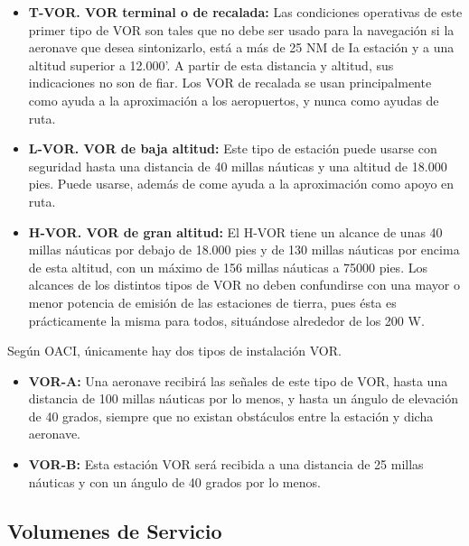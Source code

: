 \begin{itemize}
\item \textbf{T-VOR. VOR terminal o de recalada:} Las condiciones operativas de este primer tipo de VOR son tales que no debe ser usado para la navegación si la aeronave que desea sintonizarlo, está a más de 25 NM de Ia estación y a una altitud superior a 12.000'. A partir de esta distancia y altitud, sus indicaciones no son de fiar.
Los VOR de recalada se usan principalmente como ayuda a la aproximación a los aeropuertos, y nunca como ayudas de ruta.


\item \textbf{L-VOR. VOR de baja altitud:}  Este tipo de estación puede usarse con seguridad hasta una distancia de 40 millas náuticas y una altitud de 18.000 pies. Puede usarse, además de come ayuda a la aproximación como apoyo en ruta.


\item \textbf{H-VOR. VOR de gran altitud:} El H-VOR tiene un alcance de unas 40 millas náuticas por debajo de 18.000 pies y de 130 millas náuticas por encima de esta altitud, con un máximo de 156 millas náuticas a  75000 pies. Los alcances de los distintos tipos de VOR no deben confundirse con una mayor o menor potencia de emisión de las estaciones de tierra, pues ésta es prácticamente la misma para todos, situándose alrededor de los 200 W. 

\end{itemize}

Según OACI, únicamente hay dos tipos de instalación VOR. 

\begin{itemize}
\item \textbf{VOR-A:} Una aeronave recibirá las señales de este tipo de VOR, hasta una distancia de 100 millas náuticas por lo menos, y hasta un ángulo de elevación de 40 grados, siempre que no existan obstáculos entre la estación y dicha aeronave.

\item \textbf{VOR-B:} Esta estación VOR será recibida a una distancia de 25 millas náuticas y con un ángulo de 40 grados por lo menos.

\end{itemize}

\subsection{Volumenes de Servicio}
\label{sec:volumenes.de.servicio}

